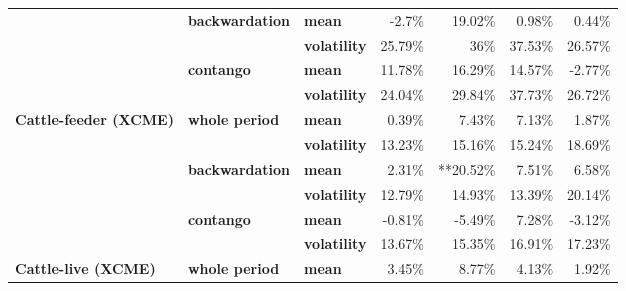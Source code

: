 \documentclass[
  authoryear,
  preprint,
  3p]{elsarticle}
\begin{document}
\begin{longtable}[t]{>{}l>{}l>{}l>{}r>{}r>{}r>{}r}
\textbf{} & \textbf{backwardation} & \textbf{mean} & \textcolor[HTML]{4285f4}{-2.7\%} & \textcolor[HTML]{4285f4}{19.02\%} & \textcolor[HTML]{4285f4}{0.98\%} & \textcolor[HTML]{4285f4}{0.44\%}\\
\textbf{} & \textbf{} & \textbf{volatility} & \textcolor[HTML]{4285f4}{25.79\%} & \textcolor[HTML]{4285f4}{36\%} & \textcolor[HTML]{4285f4}{37.53\%} & \textcolor[HTML]{4285f4}{26.57\%}\\
\textbf{} & \textbf{contango} & \textbf{mean} & \textcolor[HTML]{4285f4}{11.78\%} & \textcolor[HTML]{4285f4}{16.29\%} & \textcolor[HTML]{4285f4}{14.57\%} & \textcolor[HTML]{4285f4}{-2.77\%}\\
\addlinespace
\textbf{} & \textbf{} & \textbf{volatility} & \textcolor[HTML]{4285f4}{24.04\%} & \textcolor[HTML]{4285f4}{29.84\%} & \textcolor[HTML]{4285f4}{37.73\%} & \textcolor[HTML]{4285f4}{26.72\%}\\
\textbf{Cattle-feeder (XCME)} & \textbf{whole period} & \textbf{mean} & \textcolor[HTML]{4285f4}{0.39\%} & \textcolor[HTML]{4285f4}{7.43\%} & \textcolor[HTML]{4285f4}{7.13\%} & \textcolor[HTML]{4285f4}{1.87\%}\\
\textbf{} & \textbf{} & \textbf{volatility} & \textcolor[HTML]{4285f4}{13.23\%} & \textcolor[HTML]{4285f4}{15.16\%} & \textcolor[HTML]{4285f4}{15.24\%} & \textcolor[HTML]{4285f4}{18.69\%}\\
\textbf{} & \textbf{backwardation} & \textbf{mean} & \textcolor[HTML]{4285f4}{2.31\%} & \textcolor[HTML]{4285f4}{**20.52\%} & \textcolor[HTML]{4285f4}{7.51\%} & \textcolor[HTML]{4285f4}{6.58\%}\\
\textbf{} & \textbf{} & \textbf{volatility} & \textcolor[HTML]{4285f4}{12.79\%} & \textcolor[HTML]{4285f4}{14.93\%} & \textcolor[HTML]{4285f4}{13.39\%} & \textcolor[HTML]{4285f4}{20.14\%}\\
\addlinespace
\textbf{} & \textbf{contango} & \textbf{mean} & \textcolor[HTML]{4285f4}{-0.81\%} & \textcolor[HTML]{4285f4}{-5.49\%} & \textcolor[HTML]{4285f4}{7.28\%} & \textcolor[HTML]{4285f4}{-3.12\%}\\
\textbf{} & \textbf{} & \textbf{volatility} & \textcolor[HTML]{4285f4}{13.67\%} & \textcolor[HTML]{4285f4}{15.35\%} & \textcolor[HTML]{4285f4}{16.91\%} & \textcolor[HTML]{4285f4}{17.23\%}\\
\textbf{Cattle-live (XCME)} & \textbf{whole period} & \textbf{mean} & \textcolor[HTML]{4285f4}{3.45\%} & \textcolor[HTML]{4285f4}{8.77\%} & \textcolor[HTML]{4285f4}{4.13\%} & \textcolor[HTML]{4285f4}{1.92\%}\\

\end{longtable}
\end{document}

